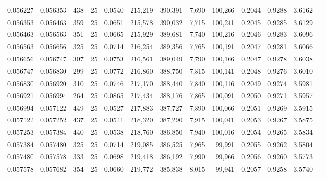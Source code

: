 \begin{tabular}{rrrrrrrrrrrrr}
0.056227 & 0.056353 &   438 &  25 &                                     0.0540 & 215,219 & 390,391 &   7,690 & 100,266 & 0.2044 & 0.9288 & 3.6162 \\
0.056353 & 0.056463 &   359 &  25 &                                     0.0651 & 215,578 & 390,032 &   7,715 & 100,241 & 0.2045 & 0.9285 & 3.6129 \\
0.056463 & 0.056563 &   351 &  25 &                                     0.0665 & 215,929 & 389,681 &   7,740 & 100,216 & 0.2046 & 0.9283 & 3.6096 \\
0.056563 & 0.056656 &   325 &  25 &                                     0.0714 & 216,254 & 389,356 &   7,765 & 100,191 & 0.2047 & 0.9281 & 3.6066 \\
0.056656 & 0.056747 &   307 &  25 &                                     0.0753 & 216,561 & 389,049 &   7,790 & 100,166 & 0.2047 & 0.9278 & 3.6038 \\
0.056747 & 0.056830 &   299 &  25 &                                     0.0772 & 216,860 & 388,750 &   7,815 & 100,141 & 0.2048 & 0.9276 & 3.6010 \\
0.056830 & 0.056920 &   310 &  25 &                                     0.0746 & 217,170 & 388,440 &   7,840 & 100,116 & 0.2049 & 0.9274 & 3.5981 \\
0.056921 & 0.056994 &   264 &  25 &                                     0.0865 & 217,434 & 388,176 &   7,865 & 100,091 & 0.2050 & 0.9271 & 3.5957 \\
0.056994 & 0.057122 &   449 &  25 &                                     0.0527 & 217,883 & 387,727 &   7,890 & 100,066 & 0.2051 & 0.9269 & 3.5915 \\
0.057122 & 0.057252 &   437 &  25 &                                     0.0541 & 218,320 & 387,290 &   7,915 & 100,041 & 0.2053 & 0.9267 & 3.5875 \\
0.057253 & 0.057384 &   440 &  25 &                                     0.0538 & 218,760 & 386,850 &   7,940 & 100,016 & 0.2054 & 0.9265 & 3.5834 \\
0.057384 & 0.057480 &   325 &  25 &                                     0.0714 & 219,085 & 386,525 &   7,965 &  99,991 & 0.2055 & 0.9262 & 3.5804 \\
0.057480 & 0.057578 &   333 &  25 &                                     0.0698 & 219,418 & 386,192 &   7,990 &  99,966 & 0.2056 & 0.9260 & 3.5773 \\
0.057578 & 0.057682 &   354 &  25 &                                     0.0660 & 219,772 & 385,838 &   8,015 &  99,941 & 0.2057 & 0.9258 & 3.5740 \\

\end{tabular}
